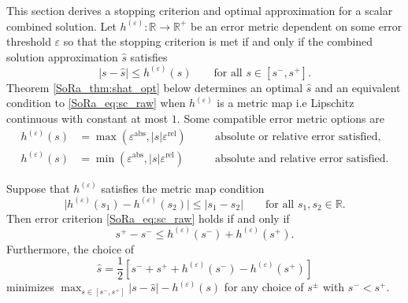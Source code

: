 \documentclass[graybox]{svmult}
\begin{document}
This section derives a stopping criterion and optimal approximation for a scalar combined solution. Let $h^{(\varepsilon)}: \mathbb{R} \to \mathbb{R}^+$ be an error metric dependent on some error threshold $\varepsilon$ so that the stopping criterion is met if and only if the combined solution approximation $\hat{s}$ satisfies 
\begin{equation}
    \lvert s-\hat{s} \rvert \leq h^{(\varepsilon)}(s) \qquad \text{for all } s \in [s^-,s^+].
    \label{SoRa_eq:sc_raw}
\end{equation}
Theorem \ref{SoRa_thm:shat_opt} below determines an optimal $\hat{s}$ and an equivalent condition to \eqref{SoRa_eq:sc_raw} when $h^{(\varepsilon)}$ is a metric map i.e Lipschitz continuous with constant at most $1$. Some compatible error metric options are
\begin{subequations}
\begin{align}
    h^{(\varepsilon)}(s) &= \max\left(\varepsilon^\text{abs},\lvert s \rvert \varepsilon^\text{rel} \right) \quad &&\text{absolute or relative error satisfied,} \label{SoRa_eq:h_abs_or_rel} \\
    h^{(\varepsilon)}(s) &= \min\left(\varepsilon^\text{abs},\lvert s \rvert \varepsilon^\text{rel} \right) \quad &&\text{absolute and relative error satisfied.} \label{SoRa_eq:h_abs_and_rel}
\end{align}
\end{subequations}
\begin{theorem} \label{SoRa_thm:shat_opt}
    Suppose that  $h^{(\varepsilon)}$ satisfies the metric map condition
    \begin{equation}
        \lvert h^{(\varepsilon)}(s_1) - h^{(\varepsilon)}(s_2) \rvert \leq \lvert s_1 - s_2 \rvert \qquad \text{for all } s_1,s_2 \in \mathbb{R}.
        \label{SoRa_eq:metric_map_cond}
    \end{equation}
    Then error criterion  \eqref{SoRa_eq:sc_raw} holds if and only if 
    \begin{equation}
        s^+-s^- \leq h^{(\varepsilon)}(s^-)+h^{(\varepsilon)}(s^+).
        \label{SoRa_eq:sc}
    \end{equation}
    Furthermore, the choice of 
    \begin{equation}
        \hat{s} = \frac{1}{2}\left[s^-+s^++h^{(\varepsilon)}(s^-)-h^{(\varepsilon)}(s^+)\right]
        \label{SoRa_eq:shat_opt}
    \end{equation}
    minimizes $\max_{s \in [s^-,s^+]} \lvert s - \hat{s} \rvert -h^{(\varepsilon)}(s)$ for any choice of $s^{\pm}$ with $s^- < s^+$.
\end{theorem}
\end{document}
